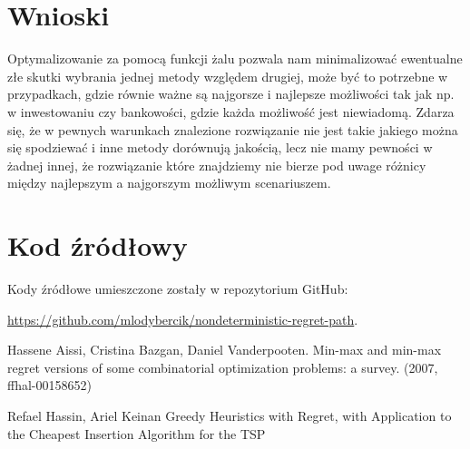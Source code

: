 \documentclass[10pt]{article}
\begin{document}
\section{Wnioski}
Optymalizowanie za pomocą funkcji żalu pozwala nam minimalizować ewentualne złe skutki wybrania jednej metody względem drugiej, może być to potrzebne w przypadkach, gdzie równie ważne są najgorsze i najlepsze możliwości tak jak np. w inwestowaniu czy bankowości, gdzie każda możliwość jest niewiadomą. Zdarza się, że w pewnych warunkach znalezione rozwiązanie nie jest takie jakiego można się spodziewać i inne metody dorównują jakością, lecz nie mamy pewności w żadnej innej, że rozwiązanie które znajdziemy nie bierze pod uwage różnicy między najlepszym a najgorszym możliwym scenariuszem.

\newpage
\appendix

\section{Kod źródłowy}
Kody źródłowe umieszczone zostały w repozytorium GitHub:

\noindent \url{https://github.com/mlodybercik/nondeterministic-regret-path}.

\begin{thebibliography}{9}
    Hassene Aissi, Cristina Bazgan, Daniel Vanderpooten.
    Min-max and min-max regret versions of some combinatorial optimization problems: a survey. (2007, ffhal-00158652)

    Refael Hassin, Ariel Keinan
    Greedy Heuristics with Regret, with Application to the Cheapest Insertion Algorithm for the TSP

\end{thebibliography}
\end{document}
